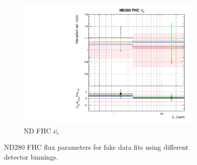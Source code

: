 \begin{figure}[!ht]
\begin{subfigure}{0.49\textwidth}
  \includegraphics[width=0.99\linewidth]{figs/detcovbinflux_3}
  \caption{ND FHC $\bar{\nu_{e}}$}
\end{subfigure}
\caption{ND280 FHC flux parameters for fake data fits using different detector binnings.}
\label{fig:detcovbinfluxND}
\end{figure}

